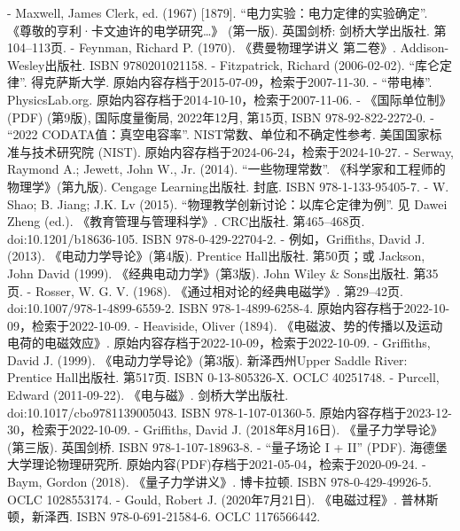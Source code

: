 - Maxwell, James Clerk, ed. (1967) [1879]. “电力实验：电力定律的实验确定”. 《尊敬的亨利·卡文迪许的电学研究…》 (第一版). 英国剑桥: 剑桥大学出版社. 第104–113页.
- Feynman, Richard P. (1970). 《费曼物理学讲义 第二卷》. Addison-Wesley出版社. ISBN 9780201021158.
- Fitzpatrick, Richard (2006-02-02). “库仑定律”. 得克萨斯大学. 原始内容存档于2015-07-09，检索于2007-11-30.
- “带电棒”. PhysicsLab.org. 原始内容存档于2014-10-10，检索于2007-11-06.
- 《国际单位制》(PDF) (第9版), 国际度量衡局, 2022年12月, 第15页, ISBN 978-92-822-2272-0.
- “2022 CODATA值：真空电容率”. NIST常数、单位和不确定性参考. 美国国家标准与技术研究院 (NIST). 原始内容存档于2024-06-24，检索于2024-10-27.
- Serway, Raymond A.; Jewett, John W., Jr. (2014). “一些物理常数”. 《科学家和工程师的物理学》(第九版). Cengage Learning出版社. 封底. ISBN 978-1-133-95405-7.
- W. Shao; B. Jiang; J.K. Lv (2015). “物理教学创新讨论：以库仑定律为例”. 见 Dawei Zheng (ed.). 《教育管理与管理科学》. CRC出版社. 第465–468页. doi:10.1201/b18636-105. ISBN 978-0-429-22704-2.
- 例如，Griffiths, David J. (2013). 《电动力学导论》(第4版). Prentice Hall出版社. 第50页；或 Jackson, John David (1999). 《经典电动力学》(第3版). John Wiley & Sons出版社. 第35页.
- Rosser, W. G. V. (1968). 《通过相对论的经典电磁学》. 第29–42页. doi:10.1007/978-1-4899-6559-2. ISBN 978-1-4899-6258-4. 原始内容存档于2022-10-09，检索于2022-10-09.
- Heaviside, Oliver (1894). 《电磁波、势的传播以及运动电荷的电磁效应》. 原始内容存档于2022-10-09，检索于2022-10-09.
- Griffiths, David J. (1999). 《电动力学导论》(第3版). 新泽西州Upper Saddle River: Prentice Hall出版社. 第517页. ISBN 0-13-805326-X. OCLC 40251748.
- Purcell, Edward (2011-09-22). 《电与磁》. 剑桥大学出版社. doi:10.1017/cbo9781139005043. ISBN 978-1-107-01360-5. 原始内容存档于2023-12-30，检索于2022-10-09.
- Griffiths, David J. (2018年8月16日). 《量子力学导论》(第三版). 英国剑桥. ISBN 978-1-107-18963-8.
- “量子场论 I + II” (PDF). 海德堡大学理论物理研究所. 原始内容(PDF)存档于2021-05-04，检索于2020-09-24.
- Baym, Gordon (2018). 《量子力学讲义》. 博卡拉顿. ISBN 978-0-429-49926-5. OCLC 1028553174.
- Gould, Robert J. (2020年7月21日). 《电磁过程》. 普林斯顿，新泽西. ISBN 978-0-691-21584-6. OCLC 1176566442.

